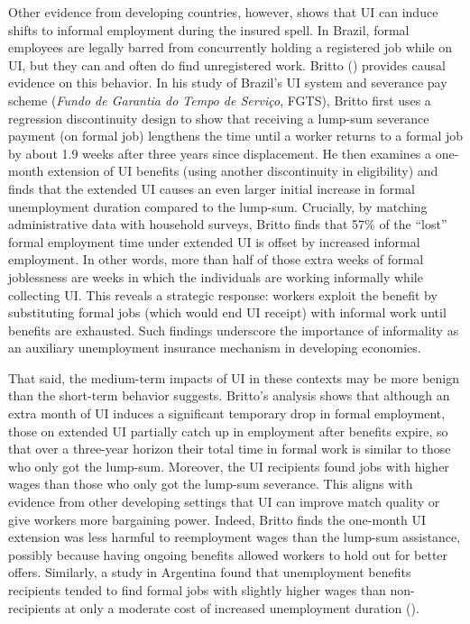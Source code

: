 \documentclass[
  4pt,
]{report}
\begin{document}
Other evidence from developing countries, however, shows that UI can
induce shifts to informal employment during the insured spell. In
Brazil, formal employees are legally barred from concurrently holding a
registered job while on UI, but they can and often do find unregistered
work. Britto () provides causal evidence
on this behavior. In his study of Brazil's UI system and severance pay
scheme (\emph{Fundo de Garantia do Tempo de Serviço}, FGTS), Britto
first uses a regression discontinuity design to show that receiving a
lump-sum severance payment (on formal job) lengthens the time until a
worker returns to a formal job by about 1.9 weeks after three years
since displacement. He then examines a one-month extension of UI
benefits (using another discontinuity in eligibility) and finds that the
extended UI causes an even larger initial increase in formal
unemployment duration compared to the lump-sum. Crucially, by matching
administrative data with household surveys, Britto finds that 57\% of
the ``lost'' formal employment time under extended UI is offset by
increased informal employment. In other words, more than half of those
extra weeks of formal joblessness are weeks in which the individuals are
working informally while collecting UI. This reveals a strategic
response: workers exploit the benefit by substituting formal jobs (which
would end UI receipt) with informal work until benefits are exhausted.
Such findings underscore the importance of informality as an auxiliary
unemployment insurance mechanism in developing economies.

That said, the medium-term impacts of UI in these contexts may be more
benign than the short-term behavior suggests. Britto's analysis shows
that although an extra month of UI induces a significant temporary drop
in formal employment, those on extended UI partially catch up in
employment after benefits expire, so that over a three-year horizon
their total time in formal work is similar to those who only got the
lump-sum. Moreover, the UI recipients found jobs with higher wages than
those who only got the lump-sum severance. This aligns with evidence
from other developing settings that UI can improve match quality or give
workers more bargaining power. Indeed, Britto finds the one-month UI
extension was less harmful to reemployment wages than the lump-sum
assistance, possibly because having ongoing benefits allowed workers to
hold out for better offers. Similarly, a study in Argentina found that
unemployment benefits recipients tended to find formal jobs with
slightly higher wages than non-recipients at only a moderate cost of
increased unemployment duration
().
\end{document}
